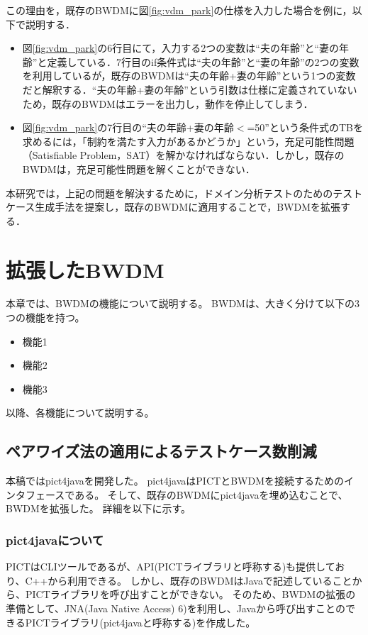 \documentclass[uplatex, report, a4j, 10pt]{jsbook}
\newcommand{\tool}{BWDM}
\begin{document}
この理由を，既存のBWDMに図\ref{fig:vdm_park}の仕様を入力した場合を例に，以下で説明する．

\begin{itemize}
	\item 図\ref{fig:vdm_park}の6行目にて，入力する2つの変数は“夫の年齢”と“妻の年齢”と定義している．7行目のif条件式は“夫の年齢”と“妻の年齢”の2つの変数を利用しているが，既存のBWDMは“夫の年齢+妻の年齢”という1つの変数だと解釈する．“夫の年齢+妻の年齢”という引数は仕様に定義されていないため，既存のBWDMはエラーを出力し，動作を停止してしまう．
	\item 図\ref{fig:vdm_park}の7行目の“夫の年齢+妻の年齢$<$=50”という条件式のTBを求めるには，「制約を満たす入力があるかどうか」という，充足可能性問題（Satisfiable Problem，SAT）を解かなければならない．しかし，既存のBWDMは，充足可能性問題を解くことができない．
\end{itemize}

本研究では，上記の問題を解決するために，ドメイン分析テストのためのテストケース生成手法を提案し，既存のBWDMに適用することで，BWDMを拡張する．


\chapter{拡張した\tool{}}\label{cha:Extended}

本章では、\tool{}の機能について説明する。
\tool{}は、大きく分けて以下の3つの機能を持つ。

\begin{itemize}
  \item 機能1
  \item 機能2
  \item 機能3
\end{itemize}

以降、各機能について説明する。

\section{ペアワイズ法の適用によるテストケース数削減}
本稿ではpict4javaを開発した。
pict4javaはPICTとBWDMを接続するためのインタフェースである。
そして、既存のBWDMにpict4javaを埋め込むことで、BWDMを拡張した。
詳細を以下に示す。

\subsection{pict4javaについて}
PICTはCLIツールであるが、API(PICTライブラリと呼称する)も提供しており、C++から利用できる。
しかし、既存のBWDMはJavaで記述していることから、PICTライブラリを呼び出すことができない。
そのため、BWDMの拡張の準備として、JNA(Java Native Access) 6)を利用し、Javaから呼び出すことのできるPICTライブラリ(pict4javaと呼称する)を作成した。
\end{document}
